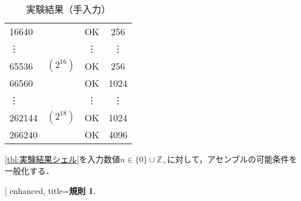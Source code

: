 \begin{table}[H]
\begin{minipage}[t]{0.45\textwidth}
{\begin{tabular}{lccc}
                16640                    &              & OK                        & 256    \\
                \vdots                   &              & \vdots                    & \vdots \\
                65536                    & \((2^{16})\) & OK                        & 256    \\
                66560                    &              & OK                        & 1024   \\
                \vdots                   &              & \vdots                    & \vdots \\
                262144                   & \((2^{18})\) & OK                        & 1024   \\
                266240                   &              & OK                        & 4096   \\
                \hline
            \end{tabular}
        }
    \end{minipage}
    \begin{minipage}[t]{0.45\textwidth}
        \centering
        \caption{実験結果（手入力）}
        \label{tbl:実験結果手入力}
        \begin{flushleft}
            \ref{tbl:実験結果シェル}を入力数値\(n\in\{0\}\cup\mathbb{Z_+}\)に対して，アセンブルの可能条件を一般化する．
            \begin{tcolorbox}[
                    enhanced,
                    title={\bfseries \hypertarget{kisoku1}{規則 1}},

\end{tcolorbox}
\end{flushleft}
\end{minipage}
\end{table}
